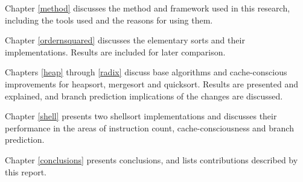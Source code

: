 Chapter \ref{method} discusses the method and framework used in this research, including the
tools used and the reasons for using them.

Chapter \ref{ordernsquared}  discusses the elementary sorts and their implementations. Results are
included for later comparison.

Chapters \ref{heap} through \ref{radix} discuss base algorithms and cache-conscious improvements
for heapsort, mergesort and quicksort. Results are presented and explained, and
branch prediction implications of the changes are discussed.

Chapter \ref{shell} presents two shellsort implementations and discusses their
performance in the areas of instruction count, cache-consciousness and branch
prediction.

Chapter \ref{conclusions} presents conclusions, and lists contributions
described by this report.
